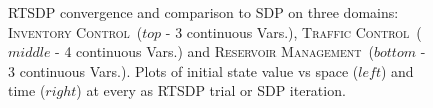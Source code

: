 \documentclass[letterpaper]{article}
\newcommand{\perfOne}{reservoir3convergence}
\newcommand{\perfTwo}{inventory3convergence}
\newcommand{\perfThree}{traffic1convergence}
\newcommand{\Invent}{\textsc{Inventory Control}}
\newcommand{\Traffic}{\textsc{Traffic Control}}
\newcommand{\Reservoir}{\textsc{Reservoir Management}}
\begin{document}
\begin{figure}[ht]
\hspace{-4mm}
 \hspace{-4mm}

\hspace{-4mm}
 \hspace{-4mm}

\hspace{-4mm}
 \hspace{-4mm}
\caption{RTSDP convergence and comparison to SDP on three domains: \Invent~($top$ - 3 continuous Vars.), \Traffic~($middle$ - 4 continuous Vars.) and \Reservoir~($bottom$ - 3 continuous Vars.). Plots of initial state value vs space ($left$) and time ($right$) at every as RTSDP trial or SDP iteration.}
\label{fig:performance}
\end{figure}
\end{document}
